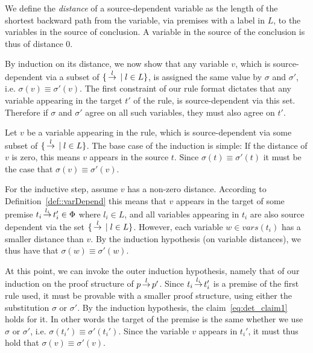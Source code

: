 
We define the \emph{distance} of a source-dependent variable as the length of the shortest 
backward path from the variable, via premises with a label in $L$, to the variables 
in the source of conclusion. A variable in the source of the conclusion is thus 
of distance $0$.

By induction on its distance, we now show that any variable $v$, which is
source-dependent via a subset of $\{ \,{\stackrel{{l}}{\rightarrow}}\, \mid l \in  L\}$,
is assigned the same value by $\sigma$ and $\sigma'$, i.e. $\sigma(v)\equiv\sigma'(v)$.
The first constraint of our rule format dictates that any variable appearing in
the target $t'$ of the rule, is source-dependent via this set. Therefore if
$\sigma$ and $\sigma'$ agree on all such variables, they must also agree on $t'$.

Let $v$ be a variable appearing in the rule, which is source-dependent via some
subset of $\{ \,{\stackrel{{l}}{\rightarrow}}\, \mid l \in  L\}$. The base case of the induction is simple:
If the distance of $v$ is zero, this means $v$ appears in the source $t$. Since
$\sigma(t)\equiv\sigma'(t)$ it must be the case that $\sigma(v)\equiv\sigma'(v)$.

For the inductive step, assume $v$ has a non-zero distance. According
to Definition~\ref{def::varDepend} this means that $v$ appears in the target of some premise
$t_i \,{\stackrel{{l_i}}{\rightarrow}}\, t_i' \in \Phi$ where $l_i\in L$, and all variables appearing
in $t_i$ are also source dependent via the set $\{ \,{\stackrel{{l}}{\rightarrow}}\, \mid l \in L \}$.
However, each variable $w\in vars(t_i)$ has a smaller distance than $v$. By the
induction hypothesis (on variable distances), we thus have that $\sigma(w)\equiv\sigma'(w)$.

At this point, we can invoke the outer induction hypothesis, namely that of our
induction on the proof structure of $p \,{\stackrel{{l}}{\rightarrow}}\, p'$. Since $t_i\,{\stackrel{{l_i}}{\rightarrow}}\,t_i'$
is a premise of the first rule used, it must be provable with a smaller proof structure,
using either the substitution $\sigma$ or $\sigma'$.
By the induction hypothesis, the claim~\eqref{eq:det_claim1} holds for it. In other words
the target of the premise is the same whether we use $\sigma$ or $\sigma'$, i.e.
$\sigma(t_i')\equiv\sigma'(t_i')$. Since the variable $v$ appears in $t_i'$, it
must thus hold that $\sigma(v)\equiv\sigma'(v)$.

